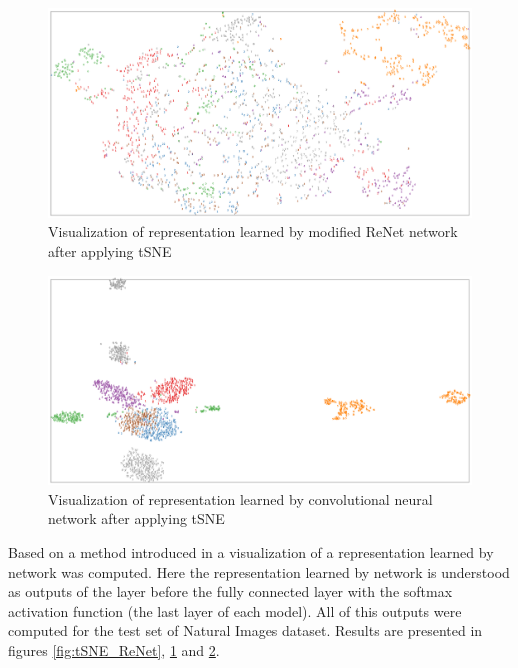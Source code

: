 \documentclass[a4paper, 10 pt, journal]{ieeeconf}
\begin{document}
\begin{figure}
\centering
	\includegraphics[width=1.0\textwidth]{img/tSNE_modif_ReNet.png}
	\caption{Visualization of representation learned by modified ReNet network after applying tSNE}
	\label{fig:tSNE_modif_ReNet}
\end{figure}

\begin{figure}
\centering
	\includegraphics[width=1.0\textwidth]{img/tSNE_conv.png}
	\caption{Visualization of representation learned by convolutional neural network after applying tSNE}
	\label{fig:tSNE_conv}
\end{figure}

Based on a method introduced in \cite{tSNE} a visualization of a representation learned by network was computed. Here the representation learned by network is understood as outputs of the layer before the fully connected layer with the softmax activation function (the last layer of each model). All of this outputs were computed for the test set of Natural Images dataset. Results are presented in figures \ref{fig:tSNE_ReNet}, \ref{fig:tSNE_modif_ReNet} and \ref{fig:tSNE_conv}.
\end{document}
